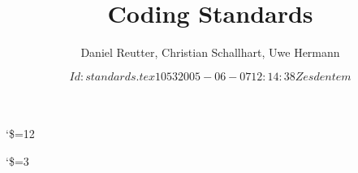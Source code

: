 \documentclass[a4paper, 11pt]{book}
\begin{document}
\title{\SYNEIGHTLOGO\\\vspace{1cm}Coding Standards}
\author{Daniel Reutter, Christian Schallhart, Uwe Hermann}
\catcode`\$=12
\date{\texttt{$Id: standards.tex 1053 2005-06-07 12:14:38Z esdentem $}}
\catcode`\$=3
\maketitle
\tableofcontents

\newpage









\appendix

\end{document}
